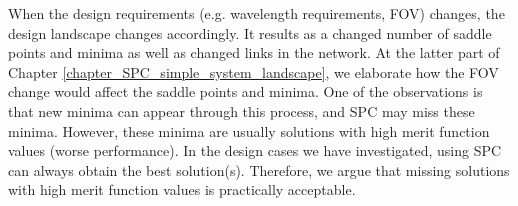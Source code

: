 When the design requirements (e.g. wavelength requirements, FOV) changes, the design landscape changes accordingly. It results as a changed number of saddle points and minima as well as changed links in the network. At the latter part of Chapter \ref{chapter_SPC_simple_system_landscape}, we elaborate how the FOV change would affect the saddle points and minima. One of the observations is that new minima can appear through this process, and SPC may miss these minima. However, these minima are usually solutions with high merit function values (worse performance). In the design cases we have investigated, using SPC can always obtain the best solution(s). Therefore, we argue that missing solutions with high merit function values is practically acceptable. 

